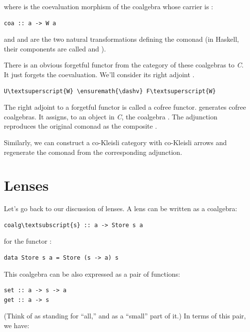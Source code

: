 \noindent
where  is the coevaluation morphism of the coalgebra whose
carrier is :

\begin{verbatim}
coa :: a -> W a
\end{verbatim}
and  and  are the two natural transformations
defining the comonad (in Haskell, their components are called
 and ).

There is an obvious forgetful functor  from the category of
these coalgebras to \emph{C}. It just forgets the coevaluation. We'll
consider its right adjoint .

\begin{Verbatim}[commandchars=\\\{\}]
U\textsuperscript{W} \ensuremath{\dashv} F\textsuperscript{W}
\end{Verbatim}
The right adjoint to a forgetful functor is called a cofree functor.
 generates cofree coalgebras. It assigns, to an object
 in \emph{C}, the coalgebra . The
adjunction reproduces the original comonad as the composite
.

Similarly, we can construct a co-Kleisli category with co-Kleisli arrows
and regenerate the comonad from the corresponding adjunction.

\section{Lenses}\label{lenses}

Let's go back to our discussion of lenses. A lens can be written as a
coalgebra:

\begin{Verbatim}[commandchars=\\\{\}]
coalg\textsubscript{s} :: a -> Store s a
\end{Verbatim}
for the functor :

\begin{verbatim}
data Store s a = Store (s -> a) s
\end{verbatim}
This coalgebra can be also expressed as a pair of functions:

\begin{verbatim}
set :: a -> s -> a
get :: a -> s
\end{verbatim}
(Think of  as standing for ``all,'' and  as a
``small'' part of it.) In terms of this pair, we have:

